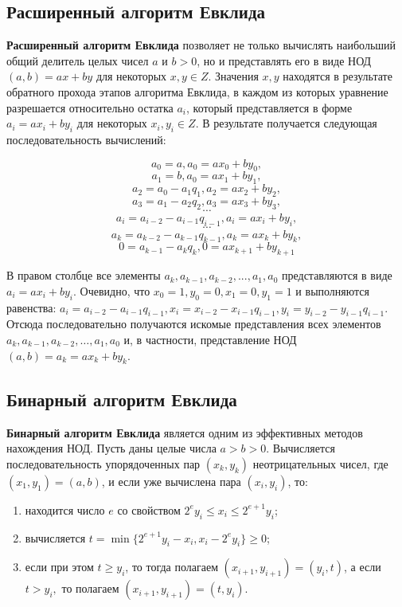 \documentclass[bachelor, och, labwork]{shiza}
\begin{document}
    \subsection{Расширенный алгоритм Евклида}

        \textbf{Расширенный алгоритм Евклида} позволяет не только вычислять
        наибольший общий делитель целых чисел $a$ и $b > 0$, но и представлять
        его в виде НОД$(a, b)= ax+by$ для некоторых $x, y \in Z$. Значения $x,y$
        находятся в результате обратного прохода этапов алгоритма Евклида, в
        каждом из которых уравнение разрешается относительно остатка $a_i$,
        который представляется в форме $a_i = ax_i + by_i$ для некоторых $x_i,
        y_i \in Z$. В результате получается следующая последовательность
        вычислений:

        $$a_0 = a, a_0 = ax_0 + by_0,$$
        $$a_1 = b, a_0 = ax_1 + by_1,$$
        $$a_2 = a_0 - a_1q_1, a_2 = ax_2 + by_2,$$
        $$a_3 = a_1 - a_2q_2, a_3 = ax_3 + by_3,$$
        $$ \cdots $$
        $$a_i = a_{i - 2} - a_{i - 1}q_{i - 1}, a_i = ax_i + by_i,$$
        $$ \cdots $$
        $$a_k = a_{k - 2} - a_{k - 1}q_{k - 1}, a_k = ax_k + by_k,$$
        $$0 = a_{k - 1} - a_k q_k, 0 = ax_{k + 1} + by_{k + 1}$$

        В правом столбце все элементы $a_k, a_{k-1}, a_{k-2}, . . . , a_1, a_0$
        представляются в виде $a_i = ax_i + by_i$. Очевидно, что $x_0 = 1, y_0 =
        0, x_1 = 0, y_1 = 1$ и выполняются равенства: $a_i = a_{i-2} - a_{i-1}
        q_{i-1}, x_i = x_{i-2} - x_{i-1} q_{i-1}, y_i = y_{i-2} - y_{i-1}
        q_{i-1}$. Отсюда последовательно получаются искомые представления всех
        элементов $a_k, a_{k-1}, a_{k-2}, \dots, a_1, a_0$ и, в частности,
        представление НОД$(a,b) = a_k = ax_k +by_k$.

    \subsection{Бинарный алгоритм Евклида}

        \textbf{Бинарный алгоритм Евклида} является одним из эффективных методов
        нахождения НОД. Пусть даны целые числа $a > b > 0$. Вычисляется
        последовательность упорядоченных пар $(x_k, y_k)$ неотрицательных чисел,
        где $(x_1, y_1) = (a, b)$, и если уже вычислена пара $(x_i , y_i)$, то:

        \begin{enumerate}
            \item находится число $e$ со свойством $2^e y_i \leq x_i \leq
            2^{e+1}y_i$;
            \item вычисляется $t = \min\{2^{e+1} y_i - x_i, x_i - 2^e y_i\} \geq
            0$;
            \item если при этом $t \geq y_i$, то тогда полагаем $(x_{i + 1},
            y_{i + 1}) = (y_i, t)$, а если $t > y_i,$ то полагаем $(x_{i + 1},
            y_{i + 1}) = (t, y_i)$.
        \end{enumerate}
        
\end{document}
